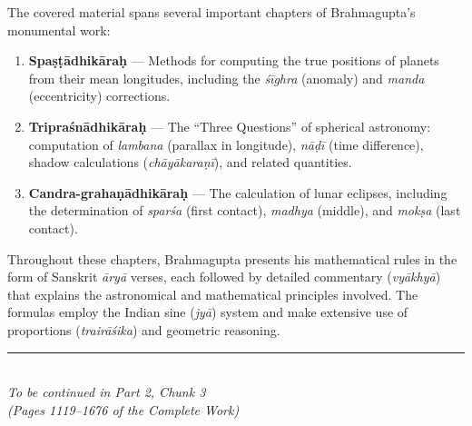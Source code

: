 \documentclass[11pt,a4paper]{article}
\newcommand{\shortline}{\noindent\rule{0.5\textwidth}{0.4pt}\par}
\begin{document}
The covered material spans several important chapters of Brahmagupta's monumental work:

\begin{enumerate}
\item \textbf{Spaṣṭādhikāraḥ} — Methods for computing the true positions of planets from their mean longitudes, including the \textit{śīghra} (anomaly) and \textit{manda} (eccentricity) corrections.

\item \textbf{Tripraśnādhikāraḥ} — The ``Three Questions'' of spherical astronomy: computation of \textit{lambana} (parallax in longitude), \textit{nāḍī} (time difference), shadow calculations (\textit{chāyākaraṇī}), and related quantities.

\item \textbf{Candra-grahaṇādhikāraḥ} — The calculation of lunar eclipses, including the determination of \textit{sparśa} (first contact), \textit{madhya} (middle), and \textit{mokṣa} (last contact).
\end{enumerate}

Throughout these chapters, Brahmagupta presents his mathematical rules in the form of Sanskrit \textit{āryā} verses, each followed by detailed commentary (\textit{vyākhyā}) that explains the astronomical and mathematical principles involved. The formulas employ the Indian sine (\textit{jyā}) system and make extensive use of proportions (\textit{trairāśika}) and geometric reasoning.

\vspace{1cm}
\begin{center}
\shortline\\[0.5cm]
\textit{To be continued in Part 2, Chunk 3}\\
\textit{(Pages 1119--1676 of the Complete Work)}
\end{center}
\end{document}
